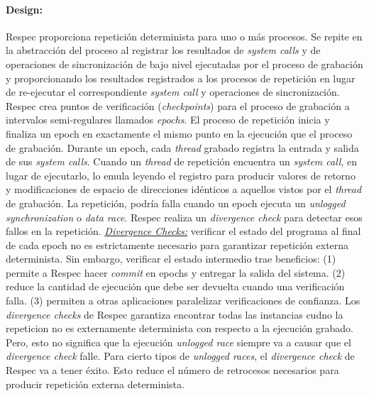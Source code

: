 \paragraph{\textnormal{\textbf{Design:}}}
Respec proporciona repetición determinista para uno o más procesos. Se repite en la abstracción del proceso al registrar los resultados de \emph{system calls} y de operaciones de sincronización de bajo nivel ejecutadas por el proceso de grabación y proporcionando los resultados registrados a los procesos de repetición en lugar de re-ejecutar el correspondiente \emph{system call} y operaciones de sincronización. Respec crea puntos de verificación (\emph{checkpoints}) para el proceso de grabación a intervalos semi-regulares llamados \emph{epochs}. El proceso de repetición inicia y finaliza un epoch en exactamente el mismo punto en la ejecución que el proceso de grabación. Durante un epoch, cada \emph{thread} grabado registra la entrada y salida de sus \emph{system calls}. Cuando un \emph{thread} de repetición encuentra un \emph{system call}, en lugar de ejecutarlo, lo emula leyendo el registro para producir valores de retorno y modificaciones de espacio de direcciones idénticos a aquellos vistos por el \emph{thread} de grabación. La repetición, podría falla cuando un epoch ejecuta un \emph{unlogged synchronization} o \emph{data race}. Respec realiza un \emph{divergence check} para detectar esos fallos en la repetición. \underline{\emph{Divergence Checks:}} verificar el estado del programa al final de cada epoch no es estrictamente necesario para garantizar repetición externa determinista. Sin embargo, verificar el estado intermedio trae beneficios: (1) permite a Respec hacer \emph{commit} en epochs y entregar la salida del sistema. (2) reduce la cantidad de ejecución que debe ser devuelta cuando una verificación falla. (3) permiten a  otras aplicaciones paralelizar verificaciones de confianza. Los \emph{divergence checks} de Respec garantiza encontrar todas las instancias cudno la repeticion no es externamente determinista con respecto a la ejecución grabado. Pero, esto no significa que la ejecución \emph{unlogged race} siempre va a causar que el \emph{divergence check} falle. Para cierto tipos de \emph{unlogged races}, el \emph{divergence check} de Respec va a tener éxito. Esto reduce el número de retrocesos necesarios para producir repetición externa determinista.

